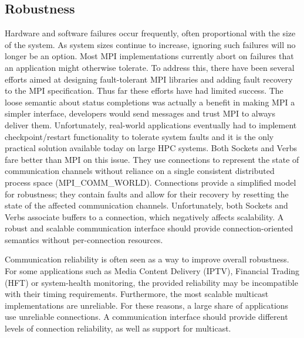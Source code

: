 \subsection{Robustness}
Hardware and software failures occur frequently, often proportional with the size of the system. 
As system sizes continue to increase, ignoring such failures will no longer be an option. 
Most MPI implementations currently abort on failures that an application might otherwise tolerate. 
To address this, there have been several efforts aimed at designing fault-tolerant MPI libraries and adding fault recovery 
to the MPI specification. Thus far these efforts have had limited success. The loose semantic about 
status completions was actually a benefit in making MPI a simpler interface, 
developers would send messages and trust MPI to always deliver them. 
Unfortunately, real-world applications eventually had to implement 
checkpoint/restart functionality to tolerate system faults and it is the 
only practical solution available today on large HPC systems. 
Both Sockets and Verbs fare better than MPI on this issue. They use connections 
to represent the state of communication channels without reliance on a single consistent 
distributed process space ({\sf MPI\_COMM\_WORLD}). Connections provide a simplified 
model for robustness; they contain faults and allow for their recovery by resetting 
the state of the affected communication channels. 
Unfortunately, both Sockets and Verbs associate buffers to a connection, which 
negatively affects scalability. A robust and scalable communication interface should provide 
connection-oriented semantics without per-connection resources. 

Communication reliability is often seen as a way to improve overall robustness. 
For some applications such as Media Content Delivery (IPTV), Financial Trading 
(HFT) or system-health monitoring, the provided reliability may be incompatible 
with their timing requirements. 
Furthermore, the most scalable multicast implementations are unreliable. For these 
reasons, a large share of applications use unreliable connections. 
A communication interface should provide different levels of connection 
reliability, as well as support for multicast. 


